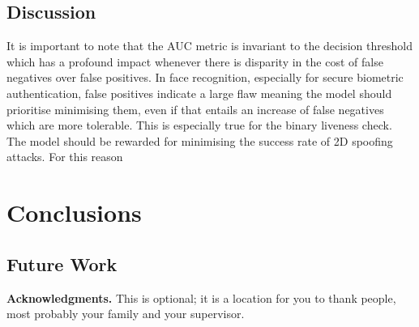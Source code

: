 \documentclass{mpaper}
\begin{document}
\subsection{Discussion}
It is important to note that the AUC metric is invariant to the decision threshold which has a profound impact whenever there is disparity in the cost of false negatives over false positives. In face recognition, especially for secure biometric authentication, false positives indicate a large flaw meaning the model should prioritise minimising them, even if that entails an increase of false negatives which are more tolerable. This is especially true for the binary liveness check. The model should be rewarded for minimising the success rate of 2D spoofing attacks. For this reason



\section{Conclusions}



\subsection{Future Work}


{\bf Acknowledgments.}
This is optional; it is a location for you to thank people, most probably your family and your supervisor.




\end{document}

